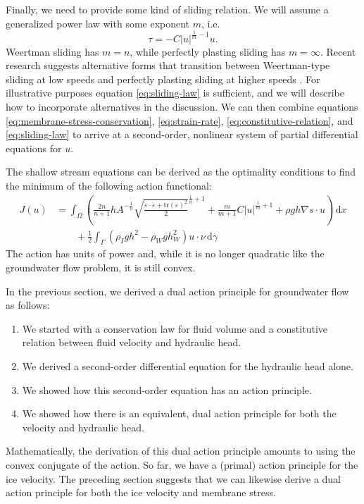 \documentclass{article}
\theoremstyle{definition}
\theoremstyle{plain}
\newcommand{\ud}{\hspace{2pt}\mathrm{d}}
\begin{document}
Finally, we need to provide some kind of sliding relation.
We will assume a generalized power law with some exponent $m$, i.e.
\begin{equation}
    \tau = -C|u|^{\frac{1}{m} - 1}u.
    \label{eq:sliding-law}
\end{equation}
Weertman sliding has $m = n$, while perfectly plasting sliding has $m = \infty$.
Recent research suggests alternative forms that transition between Weertman-type sliding at low speeds and perfectly plasting sliding at higher speeds \citep{minchew2020toward}.
For illustrative purposes equation \eqref{eq:sliding-law} is sufficient, and we will describe how to incorporate alternatives in the discussion.
We can then combine equations \eqref{eq:membrane-stress-conservation}, \eqref{eq:strain-rate}, \eqref{eq:constitutive-relation}, and \eqref{eq:sliding-law} to arrive at a second-order, nonlinear system of partial differential equations for $u$.

The shallow stream equations can be derived as the optimality conditions to find the minimum of the following action functional:
\begin{align}
    J(u) & = \int_\Omega\left(\frac{2n}{n + 1}hA^{-\frac{1}{n}}\sqrt{\frac{\dot\varepsilon\cdot\dot\varepsilon + \text{tr}(\dot\varepsilon)^2}{2}}^{\frac{1}{n} + 1} + \frac{m}{m + 1}C|u|^{\frac{1}{m} + 1} + \rho gh\nabla s\cdot u\right)\ud x  \nonumber \\
    & \qquad + \frac{1}{2}\int_\Gamma\left(\rho_Igh^2 - \rho_Wgh_W^2\right)u\cdot\nu\ud\gamma
    \label{eq:ssa-primal-action}
\end{align}
The action has units of power and, while it is no longer quadratic like the groundwater flow problem, it is still convex.

In the previous section, we derived a dual action principle for groundwater flow as follows:
\begin{enumerate}
    \item We started with a conservation law for fluid volume and a constitutive relation between fluid velocity and hydraulic head.
    \item We derived a second-order differential equation for the hydraulic head alone.
    \item We showed how this second-order equation has an action principle.
    \item We showed how there is an equivalent, dual action principle for both the velocity and hydraulic head.
\end{enumerate}
Mathematically, the derivation of this dual action principle amounts to using the convex conjugate of the action.
So far, we have a (primal) action principle for the ice velocity.
The preceding section suggests that we can likewise derive a dual action principle for both the ice velocity and membrane stress.
\end{document}
